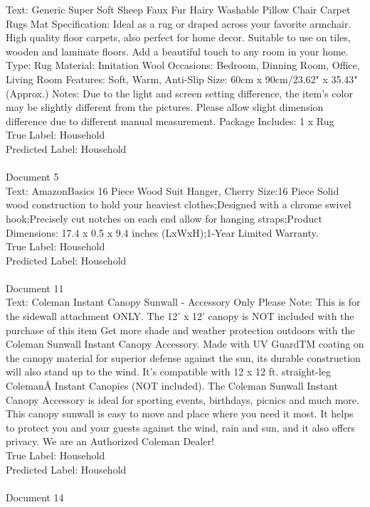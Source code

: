 \documentclass[a4paper,12pt]{article}
\begin{document}
{Text: Generic Super Soft Sheep Faux Fur Hairy Washable Pillow Chair Carpet Rugs Mat Specification: Ideal as a rug or draped across your favorite armchair. High quality floor carpets, also perfect for home decor. Suitable to use on tiles, wooden and laminate floors. Add a beautiful touch to any room in your home. Type: Rug Material: Imitation Wool Occasions: Bedroom, Dinning Room, Office, Living Room Features: Soft, Warm, Anti-Slip Size: 60cm x 90cm/23.62" x 35.43" (Approx.) Notes: Due to the light and screen setting difference, the item's color may be slightly different from the pictures. Please allow slight dimension difference due to different manual measurement. Package Includes: 1 x Rug\\
True Label: Household\\
Predicted Label: Household
\\
\\Document 5\\
Text: AmazonBasics 16 Piece Wood Suit Hanger, Cherry Size:16 Piece   Solid wood construction to hold your heaviest clothes;Designed with a chrome swivel hook;Precisely cut notches on each end allow for hanging straps;Product Dimensions: 17.4 x 0.5 x 9.4 inches (LxWxH);1-Year Limited Warranty.\\
True Label: Household\\
Predicted Label: Household\\
\\ Document 11\\
Text: Coleman Instant Canopy Sunwall - Accessory Only Please Note: This is for the sidewall attachment ONLY. The 12' x 12' canopy is NOT included with the purchase of this item Get more shade and weather protection outdoors with the Coleman Sunwall Instant Canopy Accessory. Made with UV GuardTM coating on the canopy material for superior defense against the sun, its durable construction will also stand up to the wind. It's compatible with 12 x 12 ft. straight-leg ColemanÂ Instant Canopies (NOT included). The Coleman Sunwall Instant Canopy Accessory is ideal for sporting events, birthdays, picnics and much more. This canopy sunwall is easy to move and place where you need it most. It helps to protect you and your guests against the wind, rain and sun, and it also offers privacy. We are an Authorized Coleman Dealer!\\
True Label: Household\\
Predicted Label: Household\\
\\Document 14\\
}
\end{document}
